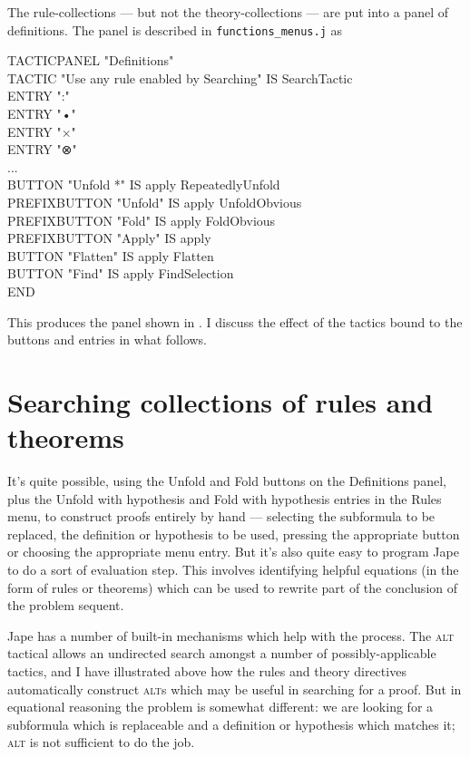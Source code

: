 The rule-collections --- but not the theory-collections --- are put into a panel of definitions. The panel is described in \texttt{functions\_menus.j} as
\begin{japeish}
TACTICPANEL "Definitions" \\
\tab TACTIC "Use any rule enabled by Searching" IS SearchTactic\\
\tab ENTRY ":"\\
\tab ENTRY "•" \\
\tab ENTRY "×" \\
\tab ENTRY "⊗" \\
\tab ...\\
\tab BUTTON "Unfold *" IS apply RepeatedlyUnfold\\
\tab PREFIXBUTTON "Unfold" IS apply UnfoldObvious\\
\tab PREFIXBUTTON "Fold" IS apply FoldObvious\\
\tab PREFIXBUTTON "Apply" IS apply\\
\tab BUTTON "Flatten" IS apply Flatten\\
\tab BUTTON "Find" IS apply FindSelection\\
END
\end{japeish}
This produces the panel shown in . I discuss the effect of the tactics bound to the buttons and entries in what follows.

\section{Searching collections of rules and theorems}

It's quite possible, using the Unfold and Fold buttons on the Definitions panel, plus the Unfold with hypothesis and Fold with hypothesis entries in the Rules menu, to construct proofs entirely by hand --- selecting the subformula to be replaced, the definition or hypothesis to be used, pressing the appropriate button or choosing the appropriate menu entry. But it's also quite easy to program Jape to do a sort of evaluation step. This involves identifying helpful equations (in the form of rules or theorems) which can be used to rewrite part of the conclusion of the problem sequent.

Jape has a number of built-in mechanisms which help with the process. The \textsc{alt} tactical allows an undirected search amongst a number of possibly-applicable tactics, and I have illustrated above how the rules and theory directives automatically construct \textsc{alt}s which may be useful in searching for a proof. But in equational reasoning the problem is somewhat different: we are looking for a subformula which is replaceable and a definition or hypothesis which matches it; \textsc{alt} is not sufficient to do the job.

